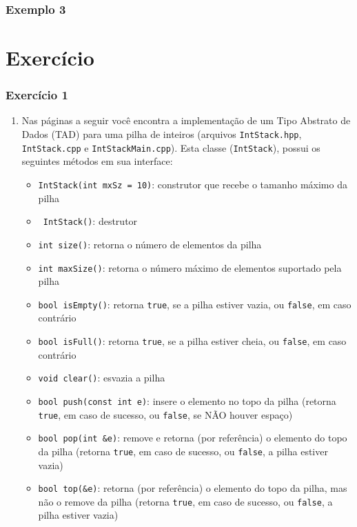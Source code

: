 \documentclass[xcolor={dvipsnames,table},aspectratio=169]{beamer}
\begin{document}
\begin{frame}[fragile]\frametitle{Exemplo 3}

\end{frame}

\section{Exercício}

\begin{frame}\frametitle{Exercício 1}
\begin{enumerate}
	\scriptsize
	\item Nas páginas a seguir você encontra a implementação de um Tipo Abstrato de Dados (TAD) para uma pilha de inteiros (arquivos \texttt{IntStack.hpp}, \texttt{IntStack.cpp} e \texttt{IntStackMain.cpp}). Esta classe (\texttt{IntStack}), possui os seguintes métodos em sua interface:\\
	\begin{itemize}
		\tiny
		\item \texttt{IntStack(int mxSz = 10)}: construtor que recebe o tamanho máximo da pilha
		\item \texttt{~IntStack()}: destrutor
		\item \texttt{int size()}: retorna o número de elementos da pilha
		\item \texttt{int maxSize()}: retorna o número máximo de elementos suportado pela pilha
		\item \texttt{bool isEmpty()}: retorna \texttt{true}, se a pilha estiver vazia, ou \texttt{false}, em caso contrário
		\item \texttt{bool isFull()}: retorna \texttt{true}, se a pilha estiver cheia, ou \texttt{false}, em caso contrário
		\item \texttt{void clear()}: esvazia a pilha
		\item \texttt{bool push(const int e)}: insere o elemento no topo da pilha (retorna \texttt{true}, em caso de sucesso, ou \texttt{false}, se NÃO houver espaço)
		\item \texttt{bool pop(int \&e)}: remove e retorna (por referência) o elemento do topo da pilha (retorna \texttt{true}, em caso de sucesso, ou \texttt{false}, a pilha estiver vazia)
		\item \texttt{bool top(\&e)}: retorna (por referência) o elemento do topo da pilha, mas não o remove da pilha (retorna \texttt{true}, em caso de sucesso, ou \texttt{false}, a pilha estiver vazia)

\end{itemize}
\end{enumerate}
\end{frame}
\end{document}
